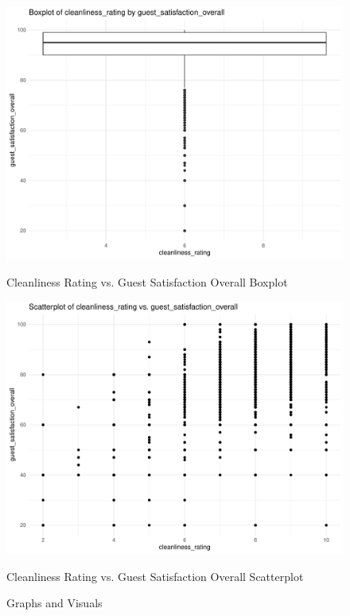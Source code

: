 \documentclass[12pt, letterpaper]{article}
\begin{document}
\begin{figure}[H]
  \vspace{0.05\textwidth}

  \begin{minipage}{0.45\textwidth}
    \includegraphics[width=\linewidth]{cleanliness_rating_guest_satisfaction_overall__boxplot.pdf}
    \caption{Cleanliness Rating vs. Guest Satisfaction Overall Boxplot}
    \label{fig:cleanliness_rating_guest_satisfaction_overall__boxplot}
  \end{minipage}
  \hspace{0.05\textwidth}
  \begin{minipage}{0.45\textwidth}
    \includegraphics[width=\linewidth]{cleanliness_rating_guest_satisfaction_overall__scatterplot.pdf}
    \caption{Cleanliness Rating vs. Guest Satisfaction Overall Scatterplot}
    \label{fig:cleanliness_rating_guest_satisfaction_overall__scatterplot}
  \end{minipage}

  \caption{Graphs and Visuals}
  \label{fig:all_graphs}
\end{figure}
\end{document}
